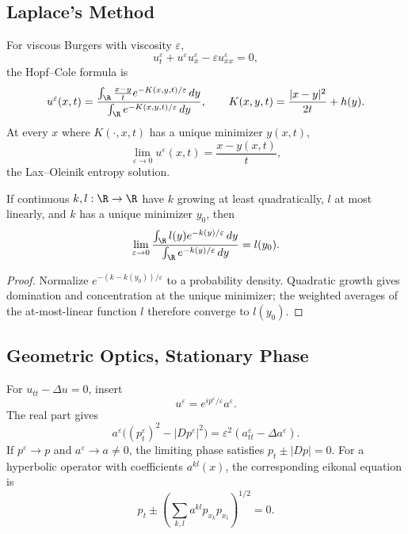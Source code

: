 \subsection{Laplace's Method}
\label{sec:laplaces-method}

\begin{example}
\label{ex:vanishing-viscosity-burgers}
For viscous Burgers with viscosity $\varepsilon$,
\[
u_t^\varepsilon+u^\varepsilon u_x^\varepsilon-\varepsilon u_{xx}^\varepsilon=0,
\]
the Hopf--Cole formula is
\[
u^\varepsilon(x,t)=
\frac{\int_\R \frac{x-y}{t}e^{-K(x,y,t)/\varepsilon}\,dy}
{\int_\R e^{-K(x,y,t)/\varepsilon}\,dy},
\qquad
K(x,y,t)=\frac{|x-y|^2}{2t}+h(y).
\]
At every $x$ where $K(\cdot,x,t)$ has a unique minimizer $y(x,t)$,
\[
\lim_{\varepsilon\to0}u^\varepsilon(x,t)=\frac{x-y(x,t)}t,
\]
the Lax--Oleinik entropy solution.
\end{example}

\begin{lemma}
\label{lem:laplace-method-asymptotics-lemma}
If continuous $k,l:\R\to\R$ have $k$ growing at least quadratically,
$l$ at most linearly, and $k$ has a unique minimizer $y_0$, then
\[
\lim_{\varepsilon\to0}
\frac{\int_\R l(y)e^{-k(y)/\varepsilon}\,dy}
{\int_\R e^{-k(y)/\varepsilon}\,dy}=l(y_0).
\]
\end{lemma}

\begin{proof}
\sketch Normalize $e^{-(k-k(y_0))/\varepsilon}$ to a probability density.
Quadratic growth gives domination and concentration at the unique minimizer;
the weighted averages of the at-most-linear function $l$ therefore converge to
$l(y_0)$.
\end{proof}

\subsection{Geometric Optics, Stationary Phase}
\label{sec:geometric-optics-stationary-phase}

\begin{example}
\label{ex:geometric-optics-oscillating-solutions}
For $u_{tt}-\Delta u=0$, insert
\[
u^\varepsilon=e^{ip^\varepsilon/\varepsilon}a^\varepsilon.
\]
The real part gives
\[
a^\varepsilon\big((p_t^\varepsilon)^2-|Dp^\varepsilon|^2\big)
=\varepsilon^2(a_{tt}^\varepsilon-\Delta a^\varepsilon).
\]
If $p^\varepsilon\to p$ and $a^\varepsilon\to a\ne0$, the limiting phase
satisfies $p_t\pm|Dp|=0$. For a hyperbolic operator with coefficients
$a^{kl}(x)$, the corresponding eikonal equation is
\[
p_t\pm\left(\sum_{k,l}a^{kl}p_{x_k}p_{x_l}\right)^{1/2}=0.
\]
\end{example}

